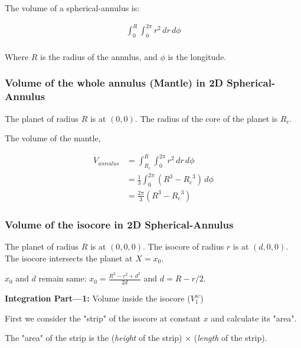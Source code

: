 \documentclass[12pt]{extarticle}
\begin{document}
The volume of a spherical-annulus is:

    \begin{align*} 
        \int_{0}^{R} \int_{0}^{2\pi} r^2 \,dr \,d\phi \\
    \end{align*}


Where $R$ is the radius of the annulus, and $\phi$ is the longitude.

\subsubsection{Volume of the whole annulus (Mantle) in 2D Spherical-Annulus}

The planet of radius $R$ is at $(0,0)$. The radius of the core of the planet is $R_c$.

The volume of the mantle,

    \begin{align*} 
        V_{annulus} &= \int_{R_c}^{R} \int_{0}^{2\pi} r^2 \,dr \,d\phi \\
        &= \frac{1}{3} \int_{0}^{2\pi} \left( R^3 - {R_c}^3  \right)\,d\phi \\
        &= \frac{2\pi}{3} \left(  R^3 - {R_c}^3  \right)
    \end{align*}

\subsubsection{Volume of the isocore in 2D Spherical-Annulus}

The planet of radius $R$ is at $(0,0,0)$. The isocore of radius $r$ is at $(d,0,0)$. The isocore intersects the planet at $X=x_0$.

$x_0$ and $d$ remain same: $x_0 = \frac{R^2 - r^2 + d^2}{2d}$ and $d = R - r/2$.

\textbf{Integration Part---1:} Volume inside the isocore ($V^{ic}_1$)

First we consider the "strip" of the isocore at constant $x$ and calculate its "area".

The "area" of the strip is the (\textit{height} of the strip) $\times$ (\textit{length} of the strip).
\end{document}
